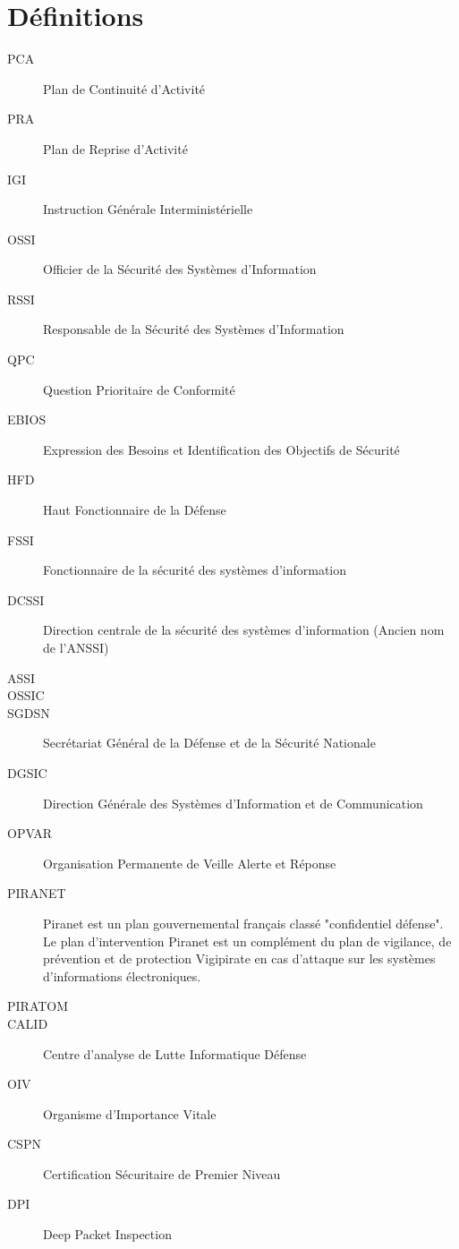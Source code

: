 \section{Définitions}
\begin{description}
 \item[PCA] Plan de Continuité d'Activité
 \item[PRA] Plan de Reprise d'Activité
 \item[IGI] Instruction Générale Interministérielle
 \item[OSSI] Officier de la Sécurité des Systèmes d'Information
 \item[RSSI] Responsable de la Sécurité des Systèmes d'Information
 \item[QPC] Question Prioritaire de Conformité
 \item[EBIOS] Expression des Besoins et Identification des Objectifs de Sécurité
 \item[HFD] Haut Fonctionnaire de la Défense
 \item[FSSI] Fonctionnaire de la sécurité des systèmes d'information
 \item[DCSSI] Direction centrale de la sécurité des systèmes d'information (Ancien nom de l'ANSSI)
 \item[ASSI]
 \item[OSSIC]
 \item[SGDSN] Secrétariat Général de la Défense et de la Sécurité Nationale
 \item[DGSIC] Direction Générale des Systèmes d'Information et de Communication
 \item[OPVAR] Organisation Permanente de Veille Alerte et Réponse
 \item[PIRANET] Piranet est un plan gouvernemental français classé "confidentiel défense". Le plan d'intervention Piranet est un complément du plan de vigilance, de prévention et de protection Vigipirate en cas d'attaque sur les systèmes d’informations électroniques.
 \item[PIRATOM] 
 \item[CALID] Centre d’analyse de Lutte Informatique Défense
 \item[OIV] Organisme d'Importance Vitale
 \item[CSPN] Certification Sécuritaire de Premier Niveau
 \item[DPI] Deep Packet Inspection
\end{description}
